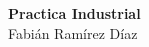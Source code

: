 \begin{center}
    \huge{
    \textbf{
        Practica Industrial
    }
    }\\
    \normalsize{
        Fabián Ramírez Díaz
    }
\end{center}